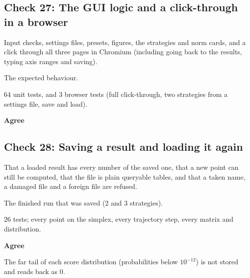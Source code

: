 \subsection*{Check 27: The GUI logic and a click-through in a browser}

\begin{description}\setlength\itemsep{0pt}

\item[What was checked] Input checks, settings files, presets, figures, the strategies and norm cards, and a click through all three pages in Chromium (including going back to the results, typing axis ranges and saving).

\item[Checked against] The expected behaviour.

\item[How many] 64 unit tests, and 3 browser tests (full click-through, two strategies from a settings file, save and load).

\item[Result] \textbf{Agree}

\end{description}


\subsection*{Check 28: Saving a result and loading it again}

\begin{description}\setlength\itemsep{0pt}

\item[What was checked] That a loaded result has every number of the saved one, that a new point can still be computed, that the file is plain queryable tables, and that a taken name, a damaged file and a foreign file are refused.

\item[Checked against] The finished run that was saved (2 and 3 strategies).

\item[How many] 26 tests; every point on the simplex, every trajectory step, every matrix and distribution.

\item[Result] \textbf{Agree}

\item[Note] The far tail of each score distribution (probabilities below $10^{-12}$) is not stored and reads back as 0.

\end{description}


